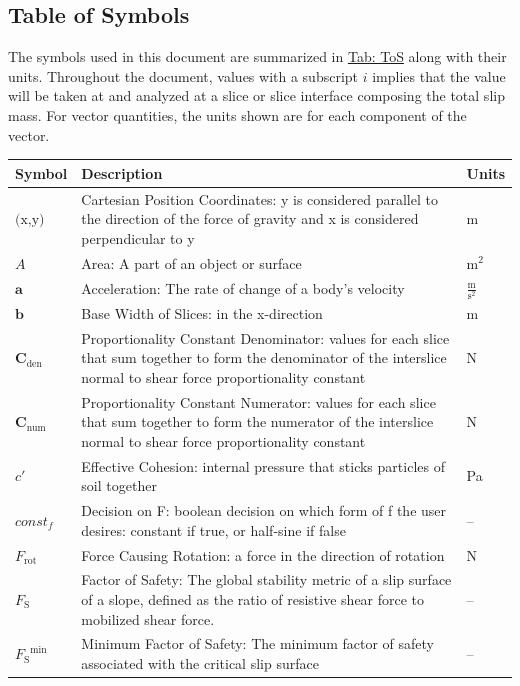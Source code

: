 \documentclass[12pt]{article}
\begin{document}
\subsection{Table of Symbols}
\label{Sec:ToS}
The symbols used in this document are summarized in \hyperref[Table:ToS]{Tab: ToS} along with their units. Throughout the document, values with a subscript $i$ implies that the value will be taken at and analyzed at a slice or slice interface composing the total slip mass. For vector quantities, the units shown are for each component of the vector.
\begin{longtabu}{l X[l] l}
\toprule
\textbf{Symbol} & \textbf{Description} & \textbf{Units}
\\
\midrule
\endhead
$\text{(x,y)}$ & Cartesian Position Coordinates: y is considered parallel to the direction of the force of gravity and x is considered perpendicular to y & m
\\
$A$ & Area: A part of an object or surface & $\text{m}^{2}$
\\
$\mathbf{a}$ & Acceleration: The rate of change of a body's velocity & $\frac{\text{m}}{\text{s}^{2}}$
\\
$\mathbf{b}$ & Base Width of Slices: in the x-direction & m
\\
${\mathbf{C}_{\text{den}}}$ & Proportionality Constant Denominator: values for each slice that sum together to form the denominator of the interslice normal to shear force proportionality constant & N
\\
${\mathbf{C}_{\text{num}}}$ & Proportionality Constant Numerator: values for each slice that sum together to form the numerator of the interslice normal to shear force proportionality constant & N
\\
$c'$ & Effective Cohesion: internal pressure that sticks particles of soil together & Pa
\\
$const_f$ & Decision on F: boolean decision on which form of f the user desires: constant if true, or half-sine if false & --
\\
${F_{\text{rot}}}$ & Force Causing Rotation: a force in the direction of rotation & N
\\
${F_{\text{S}}}$ & Factor of Safety: The global stability metric of a slip surface of a slope, defined as the ratio of resistive shear force to mobilized shear force. & --
\\
${{F_{\text{S}}}^{\text{min}}}$ & Minimum Factor of Safety: The minimum factor of safety associated with the critical slip surface & --
\\

\end{longtabu}
\end{document}
